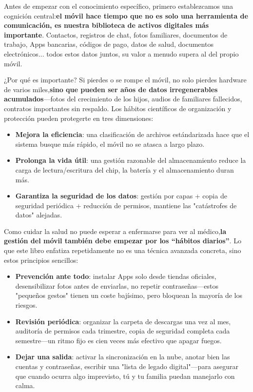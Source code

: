 
Antes de empezar con el conocimiento específico, primero establezcamos una cognición central:\textbf{el móvil hace tiempo que no es solo una herramienta de comunicación, es nuestra biblioteca de activos digitales más importante}. Contactos, registros de chat, fotos familiares, documentos de trabajo, Apps bancarias, códigos de pago, datos de salud, documentos electrónicos... todos estos datos juntos, su valor a menudo supera al del propio móvil.

\begin{tcbinfo}{¿Por qué es importante?}
Si pierdes o se rompe el móvil, no solo pierdes hardware de varios miles,\textbf{sino que pueden ser años de datos irregenerables acumulados}—fotos del crecimiento de los hijos, audios de familiares fallecidos, contratos importantes sin respaldo. Los hábitos científicos de organización y protección pueden protegerte en tres dimensiones:

\begin{itemize}
  \item \textbf{Mejora la eficiencia}: una clasificación de archivos estándarizada hace que el sistema busque más rápido, el móvil no se atasca a largo plazo.
  \item \textbf{Prolonga la vida útil}: una gestión razonable del almacenamiento reduce la carga de lectura/escritura del chip, la batería y el almacenamiento duran más.
  \item \textbf{Garantiza la seguridad de los datos}: gestión por capas + copia de seguridad periódica + reducción de permisos, mantiene las "catástrofes de datos" alejadas.
\end{itemize}

\end{tcbinfo}


Como cuidar la salud no puede esperar a enfermarse para ver al médico,\textbf{la gestión del móvil también debe empezar por los “hábitos diarios”}. Lo que este libro enfatiza repetidamente no es una técnica avanzada concreta, sino estos principios sencillos:

\begin{itemize}
  \item \textbf{Prevención ante todo}: instalar Apps solo desde tiendas oficiales, desensibilizar fotos antes de enviarlas, no repetir contraseñas—estos "pequeños gestos" tienen un coste bajísimo, pero bloquean la mayoría de los riesgos.
  \item \textbf{Revisión periódica}: organizar la carpeta de descargas una vez al mes, auditoría de permisos cada trimestre, copia de seguridad completa cada semestre—un ritmo fijo es cien veces más efectivo que apagar fuegos.
  \item \textbf{Dejar una salida}: activar la sincronización en la nube, anotar bien las cuentas y contraseñas, escribir una "lista de legado digital"—para asegurar que cuando ocurra algo imprevisto, tú y tu familia puedan manejarlo con calma.
\end{itemize}
